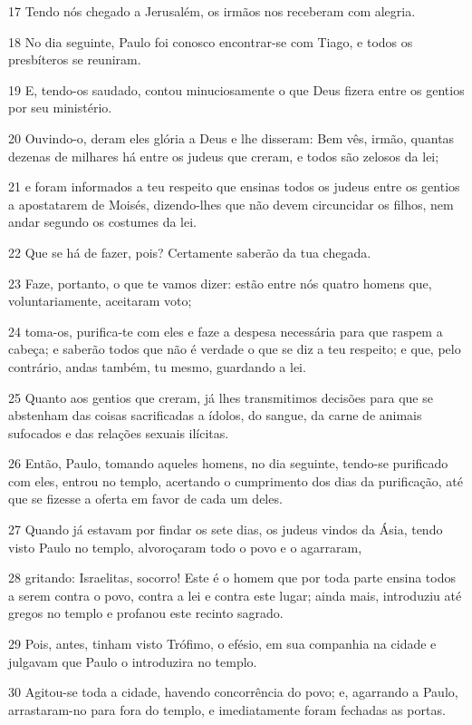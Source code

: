 \par 17 Tendo nós chegado a Jerusalém, os irmãos nos receberam com alegria.
\par 18 No dia seguinte, Paulo foi conosco encontrar-se com Tiago, e todos os presbíteros se reuniram.
\par 19 E, tendo-os saudado, contou minuciosamente o que Deus fizera entre os gentios por seu ministério.
\par 20 Ouvindo-o, deram eles glória a Deus e lhe disseram: Bem vês, irmão, quantas dezenas de milhares há entre os judeus que creram, e todos são zelosos da lei;
\par 21 e foram informados a teu respeito que ensinas todos os judeus entre os gentios a apostatarem de Moisés, dizendo-lhes que não devem circuncidar os filhos, nem andar segundo os costumes da lei.
\par 22 Que se há de fazer, pois? Certamente saberão da tua chegada.
\par 23 Faze, portanto, o que te vamos dizer: estão entre nós quatro homens que, voluntariamente, aceitaram voto;
\par 24 toma-os, purifica-te com eles e faze a despesa necessária para que raspem a cabeça; e saberão todos que não é verdade o que se diz a teu respeito; e que, pelo contrário, andas também, tu mesmo, guardando a lei.
\par 25 Quanto aos gentios que creram, já lhes transmitimos decisões para que se abstenham das coisas sacrificadas a ídolos, do sangue, da carne de animais sufocados e das relações sexuais ilícitas.
\par 26 Então, Paulo, tomando aqueles homens, no dia seguinte, tendo-se purificado com eles, entrou no templo, acertando o cumprimento dos dias da purificação, até que se fizesse a oferta em favor de cada um deles.
\par 27 Quando já estavam por findar os sete dias, os judeus vindos da Ásia, tendo visto Paulo no templo, alvoroçaram todo o povo e o agarraram,
\par 28 gritando: Israelitas, socorro! Este é o homem que por toda parte ensina todos a serem contra o povo, contra a lei e contra este lugar; ainda mais, introduziu até gregos no templo e profanou este recinto sagrado.
\par 29 Pois, antes, tinham visto Trófimo, o efésio, em sua companhia na cidade e julgavam que Paulo o introduzira no templo.
\par 30 Agitou-se toda a cidade, havendo concorrência do povo; e, agarrando a Paulo, arrastaram-no para fora do templo, e imediatamente foram fechadas as portas.
